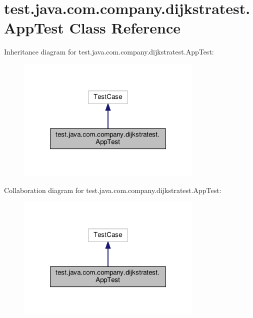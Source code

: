 \hypertarget{classtest_1_1java_1_1com_1_1company_1_1dijkstratest_1_1_app_test}{\section{test.\-java.\-com.\-company.\-dijkstratest.\-App\-Test Class Reference}
\label{classtest_1_1java_1_1com_1_1company_1_1dijkstratest_1_1_app_test}
}


Inheritance diagram for test.\-java.\-com.\-company.\-dijkstratest.\-App\-Test\-:
\nopagebreak
\begin{figure}[H]
\begin{center}
\leavevmode
\includegraphics[width=252pt]{classtest_1_1java_1_1com_1_1company_1_1dijkstratest_1_1_app_test__inherit__graph}
\end{center}
\end{figure}


Collaboration diagram for test.\-java.\-com.\-company.\-dijkstratest.\-App\-Test\-:
\nopagebreak
\begin{figure}[H]
\begin{center}
\leavevmode
\includegraphics[width=252pt]{classtest_1_1java_1_1com_1_1company_1_1dijkstratest_1_1_app_test__coll__graph}
\end{center}
\end{figure}
